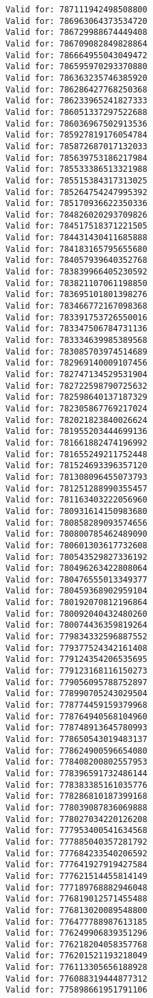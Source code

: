 \documentclass[11pt]{article}
\begin{document}
\begin{Verbatim}[commandchars=\\\{\}]
Valid for: 787111942498508800
Valid for: 786963064373534720
Valid for: 786729988674449408
Valid for: 786709082849828864
Valid for: 786664955043049472
Valid for: 786595970293370880
Valid for: 786363235746385920
Valid for: 786286427768250368
Valid for: 786233965241827333
Valid for: 786051337297522688
Valid for: 786036967502913536
Valid for: 785927819176054784
Valid for: 785872687017132033
Valid for: 785639753186217984
Valid for: 785533386513321988
Valid for: 785515384317313025
Valid for: 785264754247995392
Valid for: 785170936622350336
Valid for: 784826020293709826
Valid for: 784517518371221505
Valid for: 784431430411685888
Valid for: 784183165795655680
Valid for: 784057939640352768
Valid for: 783839966405230592
Valid for: 783821107061198850
Valid for: 783695101801398276
Valid for: 783466772167098368
Valid for: 783391753726550016
Valid for: 783347506784731136
Valid for: 783334639985389568
Valid for: 783085703974514689
Valid for: 782969140009107456
Valid for: 782747134529531904
Valid for: 782722598790725632
Valid for: 782598640137187329
Valid for: 782305867769217024
Valid for: 782021823840026624
Valid for: 781955203444699136
Valid for: 781661882474196992
Valid for: 781655249211752448
Valid for: 781524693396357120
Valid for: 781308096455073793
Valid for: 781251288990355457
Valid for: 781163403222056960
Valid for: 780931614150983680
Valid for: 780858289093574656
Valid for: 780800785462489090
Valid for: 780601303617732608
Valid for: 780543529827336192
Valid for: 780496263422808064
Valid for: 780476555013349377
Valid for: 780459368902959104
Valid for: 780192070812196864
Valid for: 780092040432480260
Valid for: 780074436359819264
Valid for: 779834332596887552
Valid for: 779377524342161408
Valid for: 779124354206535695
Valid for: 779123168116150273
Valid for: 779056095788752897
Valid for: 778990705243029504
Valid for: 778774459159379968
Valid for: 778764940568104960
Valid for: 778748913645780993
Valid for: 778650543019483137
Valid for: 778624900596654080
Valid for: 778408200802557953
Valid for: 778396591732486144
Valid for: 778383385161035776
Valid for: 778286810187399168
Valid for: 778039087836069888
Valid for: 778027034220126208
Valid for: 777953400541634568
Valid for: 777885040357281792
Valid for: 777684233540206592
Valid for: 777641927919427584
Valid for: 777621514455814149
Valid for: 777189768882946048
Valid for: 776819012571455488
Valid for: 776813020089548800
Valid for: 776477788987613185
Valid for: 776249906839351296
Valid for: 776218204058357768
Valid for: 776201521193218049
Valid for: 776113305656188928
Valid for: 776088319444877312
Valid for: 775898661951791106

\end{Verbatim}
\end{document}
